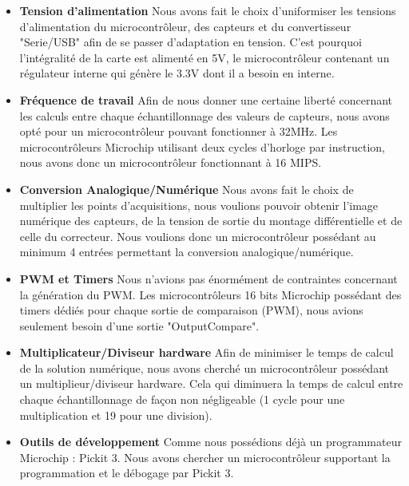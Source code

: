 \documentclass[11pt, french]{article} %
\begin{document}
\begin{itemize}
	\item \textbf{Tension d'alimentation}
	Nous avons fait le choix d'uniformiser les tensions d'alimentation du microcontrôleur, des capteurs et du convertisseur "Serie/USB" afin de se passer d'adaptation en tension. C'est pourquoi l'intégralité de la carte est alimenté en 5V, le microcontrôleur contenant un régulateur interne qui génère le 3.3V dont il a besoin en interne.

	\item \textbf{Fréquence de travail}
	Afin de nous donner une certaine liberté concernant les calculs entre chaque échantillonnage des valeurs de capteurs, nous avons opté pour un microcontrôleur pouvant fonctionner à 32MHz. Les microcontrôleurs Microchip utilisant deux cycles d'horloge par instruction, nous avons donc un microcontrôleur fonctionnant à 16 MIPS. 

	\item \textbf{Conversion Analogique/Numérique}
 	Nous avons fait le choix de multiplier les points d'acquisitions, nous voulions pouvoir obtenir l'image numérique des capteurs, de la tension de sortie du montage différentielle et de celle du correcteur. Nous voulions donc un microcontrôleur possédant au minimum 4 entrées permettant la conversion analogique/numérique.

	\item \textbf{PWM et Timers} 
	Nous n'avions pas énormément de contraintes concernant la génération du PWM. Les microcontrôleurs 16 bits Microchip possédant des timers dédiés pour chaque sortie de comparaison (PWM), nous avions seulement besoin d'une sortie "OutputCompare".

	\item \textbf{Multiplicateur/Diviseur hardware}
	Afin de minimiser le temps de calcul de la solution numérique, nous avons cherché un microcontrôleur possédant un multiplieur/diviseur hardware. Cela qui diminuera la temps de calcul entre chaque échantillonnage de façon non négligeable (1 cycle pour une multiplication et 19 pour une division).

	\item \textbf{Outils de développement}
	Comme nous possédions déjà un programmateur Microchip : Pickit 3. Nous avons chercher un microcontrôleur supportant la programmation et le débogage par Pickit 3.

\end{itemize}
\end{document}
